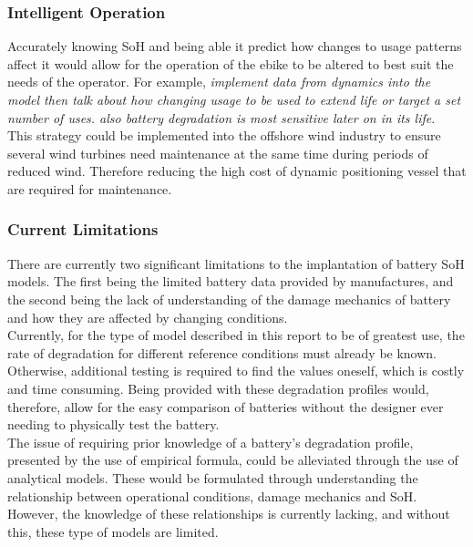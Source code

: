 \documentclass[a4paper, 10pt]{article}
\numberwithin{equation}{section}
\begin{document}
\subsubsection{Intelligent Operation}
Accurately knowing SoH and being able it predict how changes to usage patterns affect it would allow for the operation of the ebike to be altered to best suit the needs of the operator. For example, \textit{implement data from dynamics into the model then talk about how changing usage to be used to extend life or target a set number of uses. also battery degradation is most sensitive later on in its life}.\\
This strategy could be implemented into the offshore wind industry to ensure several wind turbines need maintenance at the same time during periods of reduced wind. Therefore reducing the high cost of dynamic positioning vessel that are required for maintenance. 


\subsubsection{Current Limitations}

There are currently two significant limitations to the implantation of battery SoH models. The first being the limited battery data provided by manufactures, and the second being the lack of understanding of the damage mechanics of battery and how they are affected by changing conditions.
\\

Currently, for the type of model described in this report to be of greatest use, the rate of degradation for different reference conditions must already be known. Otherwise, additional testing is required to find the values oneself, which is costly and time consuming. Being provided with these degradation profiles would, therefore, allow for the easy comparison of batteries without the designer ever needing to physically test the battery.
\\

The issue of requiring prior knowledge of a battery's degradation profile, presented by the use of empirical formula, could be alleviated through the use of analytical models. These would be formulated through understanding the relationship between operational conditions, damage mechanics and SoH. However, the knowledge of these relationships is currently lacking, and without this, these type of models are limited.
\end{document}
